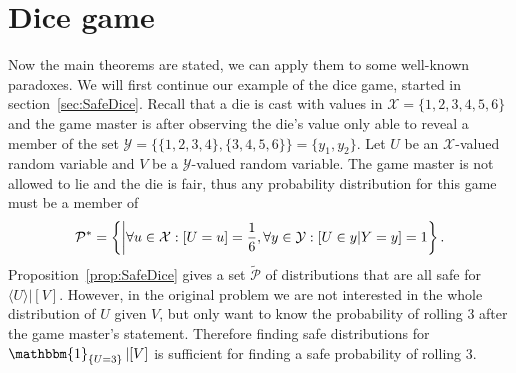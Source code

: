 \documentclass[twoside,a4paper]{report}
\theoremstyle{plain}
\theoremstyle{definition}
\theoremstyle{remark}
\numberwithin{equation}{chapter}
\let\P\relax
\DeclareMathOperator{\P}{\mathbb{P}}
\DeclareMathOperator{\1}{\mathbbm{1}}
\newcommand{\X}{\mathcal{X}}
\newcommand{\Y}{\mathcal{Y}}
\newcommand{\Pmod}{\mathcal{P}^*}
\newcommand{\DieInd}{\1_{\{U=3\}}}
\begin{document}
\section{Dice game}
Now the main theorems are stated, we can apply them to some well-known paradoxes. We will first continue our example of the dice game, started in section~\ref{sec:SafeDice}. Recall that a die is cast with values in $\X=\{1,2,3,4,5,6\}$ and the game master is after observing the die's value only able to reveal a member of the set $\Y=\{\{1,2,3,4\},\{3,4,5,6\}\}=\{y_1,y_2\}$. Let $U$ be an $\X$-valued random variable and $V$ be a $\Y$-valued random variable. The game master is not allowed to lie and the die is fair, thus any probability distribution for this game must be a member of \begin{equation}
\Pmod=\left\{\P\middle|\forall u\in\X:\P[U=u]=\frac{1}{6},\forall y\in\Y:\P[U\in y|Y=y]=1\right\}.
\end{equation}
Proposition~\ref{prop:SafeDice} gives a set $\tilde{\mathcal{P}}$ of distributions that are all safe for $\langle U\rangle|[V]$. However, in the original problem we are not interested in the whole distribution of $U$ given $V$, but only want to know the probability of rolling $3$ after the game master's statement. Therefore finding safe distributions for $\DieInd|[V]$ is sufficient for finding a safe probability of rolling $3$.
\end{document}

